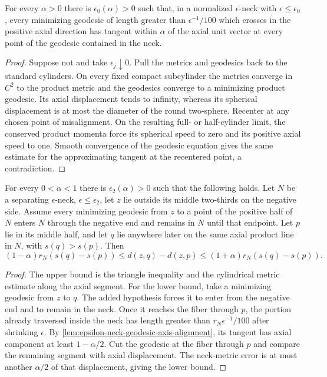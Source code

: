 \begin{lemma}
\label{lem:epsilon-neck-geodesic-axis-alignment}
\notready
For every $\alpha>0$ there is $\epsilon_0(\alpha)>0$ such that, in a
normalized $\epsilon$-neck with $\epsilon\le\epsilon_0$, every minimizing
geodesic of length greater than $\epsilon^{-1}/100$ which crosses in the
positive axial direction has tangent within $\alpha$ of the axial unit
vector at every point of the geodesic contained in the neck.
\end{lemma}

\begin{proof}
Suppose not and take $\epsilon_j\downarrow0$.  Pull the metrics and geodesics
back to the standard cylinders.  On every fixed compact subcylinder the
metrics converge in $C^2$ to the product metric and the geodesics converge
to a minimizing product geodesic.  Its axial displacement tends to infinity,
whereas its spherical displacement is at most the diameter of the round
two-sphere.  Recenter at any chosen point of misalignment.  On the resulting
full- or half-cylinder limit, the conserved product momenta force its
spherical speed to zero and its positive axial speed to one.  Smooth
convergence of the geodesic equation gives the same estimate for the
approximating tangent at the recentered point, a contradiction.
\end{proof}

\begin{lemma}
\label{lem:external-point-neck-distance-comparison}
\notready
For every $0<\alpha<1$ there is $\epsilon_2(\alpha)>0$ such that the
following holds.  Let $N$ be a separating $\epsilon$-neck,
$\epsilon\le\epsilon_2$, let $z$ lie outside its middle two-thirds on the
negative side.  Assume every minimizing geodesic from $z$ to a point of the
positive half of $N$ enters $N$ through the negative end and remains in $N$
until that endpoint.  Let $p$ lie in its middle half, and let $q$ lie anywhere
later on the same axial product line in $N$, with $s(q)>s(p)$.  Then
\[
 (1-\alpha)r_N(s(q)-s(p))
 \le d(z,q)-d(z,p)
 \le(1+\alpha)r_N(s(q)-s(p)).
\]
\end{lemma}

\begin{proof}
The upper bound is the triangle inequality and the cylindrical metric
estimate along the axial segment.  For the lower bound, take a minimizing
geodesic from $z$ to $q$.  The added hypothesis forces it to enter from the
negative end and to remain in the neck.  Once it reaches the fiber through
$p$, the portion already traversed inside the neck has length greater than
$r_N\epsilon^{-1}/100$ after shrinking $\epsilon$.
By \ref{lem:epsilon-neck-geodesic-axis-alignment}, its tangent has axial
component at least $1-\alpha/2$.  Cut the geodesic at the fiber through $p$
and compare the remaining segment with axial displacement.  The neck-metric
error is at most another $\alpha/2$ of that displacement, giving the lower
bound.
\end{proof}

